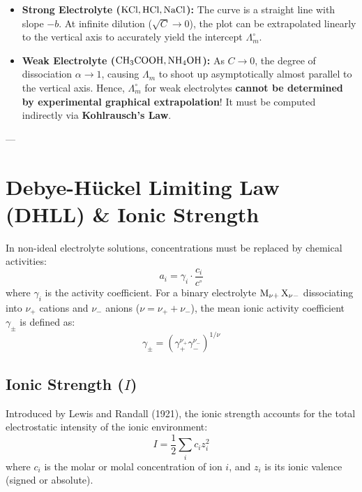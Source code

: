 \begin{conceptbox}
\begin{itemize}[leftmargin=*]
    \item \textbf{Strong Electrolyte ($\ce{KCl}, \ce{HCl}, \ce{NaCl}$):} The curve is a straight line with slope $-b$. At infinite dilution ($\sqrt{C} \to 0$), the plot can be extrapolated linearly to the vertical axis to accurately yield the intercept $\Lambda_m^\circ$.
    \item \textbf{Weak Electrolyte ($\ce{CH3COOH}, \ce{NH4OH}$):} As $C \to 0$, the degree of dissociation $\alpha \to 1$, causing $\Lambda_m$ to shoot up asymptotically almost parallel to the vertical axis. Hence, $\Lambda_m^\circ$ for weak electrolytes \textbf{cannot be determined by experimental graphical extrapolation}! It must be computed indirectly via \textbf{Kohlrausch's Law}.
\end{itemize}
\end{conceptbox}

---

\section{Debye-Hückel Limiting Law (DHLL) \& Ionic Strength}

In non-ideal electrolyte solutions, concentrations must be replaced by chemical activities:
\begin{equation}
    a_i = \gamma_i \cdot \frac{c_i}{c^\circ}
\end{equation}
where $\gamma_i$ is the activity coefficient. For a binary electrolyte $\ce{M_{\nu+} X_{\nu-}}$ dissociating into $\nu_+$ cations and $\nu_-$ anions ($\nu = \nu_+ + \nu_-$), the mean ionic activity coefficient $\gamma_\pm$ is defined as:
\begin{equation}
    \gamma_\pm = \left( \gamma_+^{\nu_+} \gamma_-^{\nu_-} \right)^{1/\nu}
\end{equation}

\subsection{Ionic Strength ($I$)}
Introduced by Lewis and Randall (1921), the ionic strength accounts for the total electrostatic intensity of the ionic environment:
\begin{equation}
    \boxed{I = \frac{1}{2} \sum_{i} c_i z_i^2}
\end{equation}
where $c_i$ is the molar or molal concentration of ion $i$, and $z_i$ is its ionic valence (signed or absolute).

